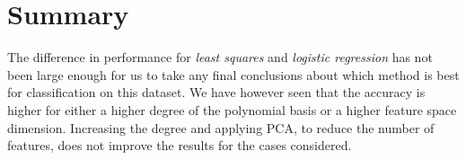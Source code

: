 \documentclass[10pt,conference,compsocconf]{IEEEtran}
\begin{document}
\section{Summary}
\label{sec:tips-writing}
  The difference in performance for \textit{least squares} and \textit{logistic regression} has not been large enough for us to take any final conclusions about which method is best for classification on this dataset. We have however seen that the accuracy is higher for either a higher degree of the polynomial basis or a higher feature space dimension. Increasing the degree and applying PCA, to reduce the number of features, does not improve the results for the cases considered.



\end{document}
